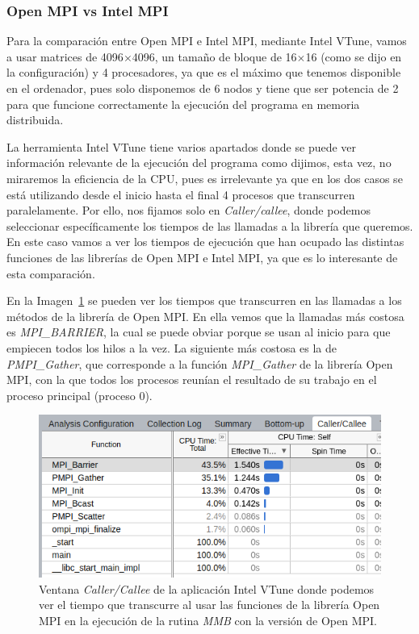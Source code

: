 \documentclass[a4paper,12pt]{article}
\begin{document}
\subsubsection{Open MPI vs Intel MPI}
\label{sec:mpi-impi}
Para la comparación entre Open MPI e Intel MPI, mediante Intel VTune, vamos a usar matrices de 4096$\times$4096, un tamaño de bloque de 16$\times$16 (como se dijo en la configuración) y 4 procesadores, ya que es el máximo que tenemos disponible en el ordenador, pues solo disponemos de 6 nodos y tiene que ser potencia de 2 para que funcione correctamente la ejecución del programa en memoria distribuida.

La herramienta Intel VTune tiene varios apartados donde se puede ver información relevante de la ejecución del programa como dijimos, esta vez, no miraremos la eficiencia de la CPU, pues es irrelevante ya que en los dos casos se está utilizando desde el inicio hasta el final 4 procesos que transcurren paralelamente. Por ello, nos fijamos solo en {\it Caller/callee}, donde podemos seleccionar específicamente los tiempos de las llamadas a la librería que queremos. En este caso vamos a ver los tiempos de ejecución que han ocupado las distintas funciones de las librerías de Open MPI e Intel MPI, ya que es lo interesante de esta comparación.

En la Imagen~\ref{fig:vtune-mpi} se pueden ver los tiempos que transcurren en las llamadas a los métodos de la librería de Open MPI. En ella vemos que la llamadas más costosa es {\it MPI\_BARRIER}, la cual se puede obviar porque se usan al inicio para que empiecen todos los hilos a la vez. La siguiente más costosa es la de {\it PMPI\_Gather}, que corresponde a la función {\it MPI\_Gather} de la librería Open MPI, con la que todos los procesos reunían el resultado de su trabajo en el proceso principal (proceso 0). 
\begin{figure}[htbp]
    \includegraphics[scale=0.6]{./images/vtunempiTabla.png}
    \centering
    \caption{Ventana {\it Caller/Callee} de la aplicación Intel VTune donde podemos ver el tiempo que transcurre al usar las funciones de la librería Open MPI en la ejecución de la rutina {\it MMB} con la versión de Open MPI.}
    \label{fig:vtune-mpi}
\end{figure}
\end{document}
